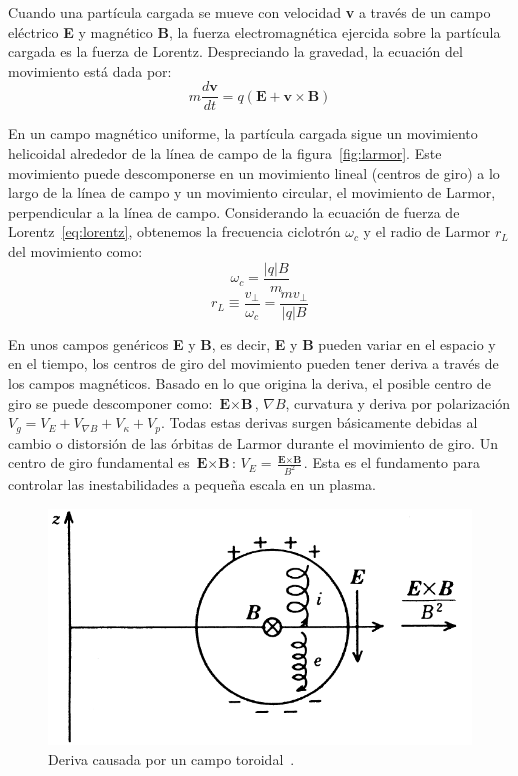 Cuando una partícula cargada se mueve con velocidad \textbf{v} a través de un campo eléctrico \textbf{E} y magnético 
\textbf{B}, la fuerza electromagnética ejercida sobre la partícula cargada es la fuerza de Lorentz. Despreciando 
la gravedad, la ecuación del movimiento está dada por:
\begin{equation}\label{eq:lorentz}
    m\frac{d\textbf{v}}{dt}=q(\textbf{E}+\textbf{v}\times \textbf{B})
\end{equation}
\par
En un campo magnético uniforme, la partícula cargada sigue un movimiento helicoidal alrededor de la
línea de campo de la figura~\ref{fig:larmor}. Este movimiento puede descomponerse en un movimiento lineal (centros de giro)
a lo largo de la línea de campo y un movimiento circular, el movimiento de Larmor, perpendicular a la línea de campo.
Considerando la ecuación de fuerza de Lorentz~\eqref{eq:lorentz}, obtenemos la frecuencia ciclotrón $\omega_c$ y 
el radio de Larmor $r_L$ del movimiento como:
\begin{equation}\label{eq:ciclotron}
    \omega_c=\frac{\lvert q\rvert B}{m}
\end{equation}
\begin{equation}\label{eq:radiolarmor}
    r_L\equiv\frac{v_\perp}{\omega_c}=\frac{mv_\perp}{\lvert q\rvert B}
\end{equation}
\par
En unos campos genéricos \textbf{E} y \textbf{B}, es decir, \textbf{E} y \textbf{B} pueden variar en el espacio y en el 
tiempo, los centros de giro del movimiento pueden tener deriva a través de los campos magnéticos. Basado en lo que origina 
la deriva, el posible centro de giro se puede descomponer como: $\textbf{E}\times\textbf{B}$, $\nabla B$, curvatura 
y deriva por polarización $V_g=V_E+V_{\nabla B}+V_\kappa+V_p$. Todas estas derivas surgen básicamente debidas al 
cambio o distorsión de las órbitas de Larmor durante el movimiento de giro. Un centro de giro fundamental 
es $\textbf{E}\times\textbf{B}$: $V_E=\frac{\textbf{E}\times\textbf{B}}{B^2}$. 
Esta es el fundamento para controlar las inestabilidades a pequeña escala en un plasma.
\begin{figure}
    \centering
    \includegraphics[scale=0.5]{img/drift.png}
    \caption[Deriva causada por un campo toroidal]{Deriva causada por un campo toroidal~\cite{Miyamoto2011}.}
    \label{fig:drift}
\end{figure}
\par

